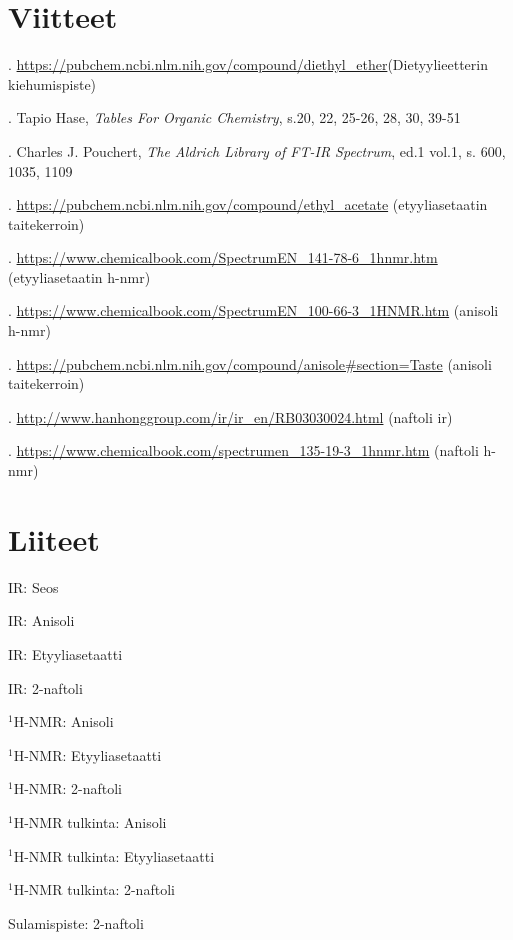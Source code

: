 \documentclass[11pt,a4paper]{article}
\begin{document}
\pagebreak

\section{Viitteet}



.  \url{https://pubchem.ncbi.nlm.nih.gov/compound/diethyl_ether}(Dietyylieetterin kiehumispiste)

. Tapio Hase, \textit{Tables For Organic Chemistry}, s.20, 22, 25-26, 28, 30, 39-51

. Charles J. Pouchert, \textit{The Aldrich Library of FT-IR Spectrum}, ed.1 vol.1, s. 600, 1035, 1109

. \url{https://pubchem.ncbi.nlm.nih.gov/compound/ethyl_acetate} (etyyliasetaatin taitekerroin)

. \url{https://www.chemicalbook.com/SpectrumEN_141-78-6_1hnmr.htm} (etyyliasetaatin h-nmr)

. \url{https://www.chemicalbook.com/SpectrumEN_100-66-3_1HNMR.htm} (anisoli h-nmr)

. \url{https://pubchem.ncbi.nlm.nih.gov/compound/anisole#section=Taste} (anisoli taitekerroin)

. \url{http://www.hanhonggroup.com/ir/ir_en/RB03030024.html} (naftoli ir)

. \url{https://www.chemicalbook.com/spectrumen_135-19-3_1hnmr.htm} (naftoli h-nmr)

\section{Liiteet}

\noindent IR: Seos 

\noindent IR: Anisoli 

\noindent IR: Etyyliasetaatti 

\noindent IR: 2-naftoli

\noindent $^1$H-NMR: Anisoli

\noindent $^1$H-NMR: Etyyliasetaatti

\noindent $^1$H-NMR: 2-naftoli 

\noindent $^1$H-NMR tulkinta: Anisoli

\noindent $^1$H-NMR tulkinta: Etyyliasetaatti 

\noindent $^1$H-NMR tulkinta: 2-naftoli 

\noindent Sulamispiste: 2-naftoli
\end{document}
